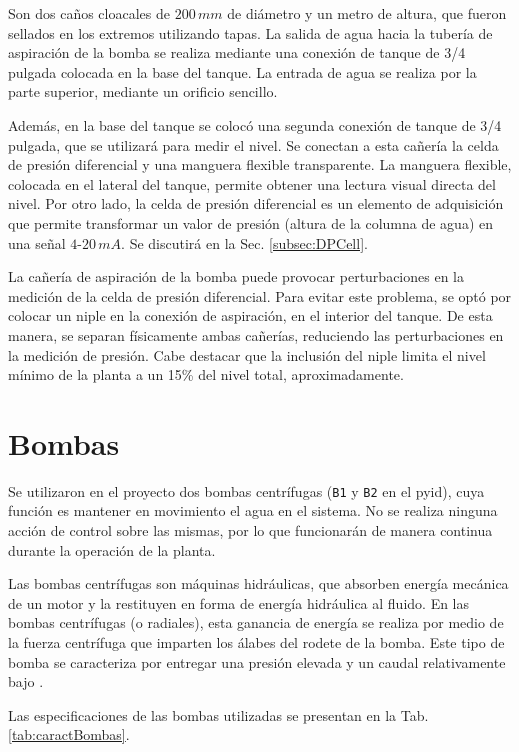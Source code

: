 Son dos caños cloacales de $200\,mm$ de diámetro y un metro de altura, que
fueron
sellados en los extremos utilizando tapas.
La salida de agua hacia la tubería de aspiración de la bomba se realiza
mediante una conexión de tanque de 3/4 pulgada colocada en la base del tanque.
La entrada de agua se realiza por la parte superior, mediante un orificio
sencillo.

Además, en la base del tanque se colocó una segunda conexión de tanque de 3/4
pulgada, que se utilizará para medir el nivel.
Se conectan a esta cañería la celda de presión diferencial y una manguera
flexible transparente.
La manguera flexible, colocada en el lateral del tanque, permite obtener una
lectura visual directa del nivel.
Por otro lado, la celda de presión diferencial es un elemento de adquisición
que permite transformar un valor de presión (altura de la columna de agua) en
una señal $4$-$20\,mA$.
Se discutirá en la Sec. \ref{subsec:DPCell}.

La cañería de aspiración de la bomba puede provocar
perturbaciones en la medición de la celda de presión diferencial.
Para evitar este problema, se optó por
colocar un niple en la conexión de aspiración, en el interior del tanque.
De esta manera, se separan físicamente ambas cañerías, reduciendo las
perturbaciones en la medición de presión.
Cabe destacar que la inclusión del niple limita el nivel mínimo de la planta a
un 15\% del nivel total, aproximadamente.

\section{Bombas}
\label{sec:Bombas}

Se utilizaron en el proyecto dos bombas centrífugas (\verb|B1| y \verb|B2| en
el \gls{pyid}), cuya función es
mantener en movimiento el agua en el sistema.
No se realiza ninguna acción de control sobre las
mismas, por lo que funcionarán de manera continua durante la operación de la
planta.

Las bombas centrífugas son máquinas hidráulicas, que absorben energía mecánica
de un motor y la restituyen en forma de energía hidráulica al fluido.
En las bombas centrífugas (o radiales), esta ganancia de energía se realiza por
medio de la fuerza centrífuga que imparten los álabes del rodete de la bomba.
Este tipo de bomba se caracteriza por entregar una presión elevada y un caudal
relativamente bajo \cite{bib:Mataix}.

Las especificaciones de las bombas utilizadas se presentan en la Tab.
\ref{tab:caractBombas}.

